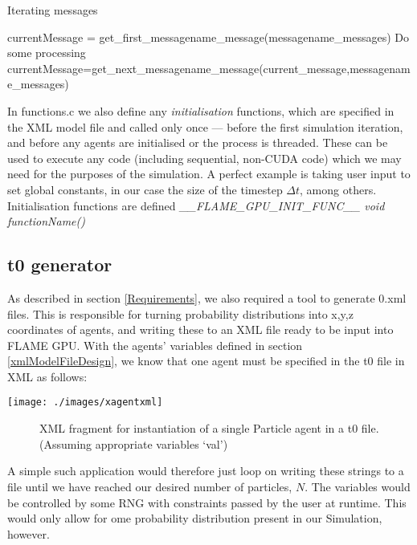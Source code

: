 \documentclass[11pt,a4paper]{article}
\begin{document}
\begin{algorithm}[H]
\label{messageIteration}
\caption{Iterating messages}
\begin{algorithmic}
\STATE currentMessage = get\_first\_messagename\_message(messagename\_messages)
  \STATE Do some processing
  \STATE currentMessage=get\_next\_messagename\_message(current\_message,messagename\_messages)
\ENDWHILE
\end{algorithmic}
\end{algorithm}

In functions.c we also define any \emph{initialisation} functions, which are specified in the XML model file and called only once --- before the first simulation iteration, and before any agents are initialised or the process is threaded. These can be used to execute any code (including sequential, non-CUDA code) which we may need for the purposes of the simulation. A perfect example is taking user input to set global constants, in our case the size of the timestep $\Delta t$, among others. Initialisation functions are defined \emph{\_\_FLAME\_GPU\_INIT\_FUNC\_\_ void functionName()}

\subsection{t0 generator}
As described in section \ref{Requirements}, we also required a tool to generate 0.xml files. This is responsible for turning probability distributions into x,y,z coordinates of agents, and writing these to an XML file ready to be input into FLAME GPU. With the agents' variables defined in section \ref{xmlModelFileDesign}, we know that one agent must be specified in the t0 file in XML as follows:

\texttt{[image: ./images/xagentxml]}
\begin{figure}[h!]
\caption[Single Particle agent XML]{XML fragment for instantiation of a single Particle agent in a t0 file. (Assuming appropriate variables `val')}
\end{figure}

A simple such application would therefore just loop on writing these strings to a file until we have reached our desired number of particles, $N$. The variables would be controlled by some RNG with constraints passed by the user at runtime. This would only allow for ome probability distribution present in our Simulation, however. 
\end{document}
